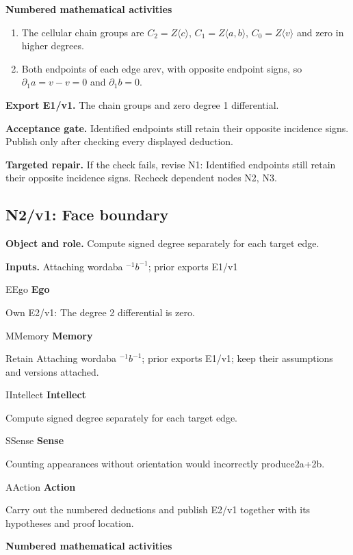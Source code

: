 \documentclass[preprint,12pt,aps,pra,showkeys,amsmath,amssymb,superscriptaddress,floatfix]{revtex4-2}
\theoremstyle{definition}
\theoremstyle{remark}
\newcommand{\mmfaculty}[3]{%
 \begin{mmfacultybox}{#1}{#2}
 {\sffamily\bfseries\color{MMBlue}#2}\par\smallskip #3
 \end{mmfacultybox}}
\newcommand{\field}[2]{\par\smallskip\noindent\textbf{#1.} #2\par}
\begin{document}
\smallskip\noindent\textbf{Numbered mathematical activities}

\begin{enumerate}[label=N1.\arabic*,leftmargin=3.4em]

\item The cellular chain groups are \(C_{2}=Z\langle c\rangle\),
\(C_{1}=Z\langle a,b\rangle\), \(C_{0}=Z\langle v\rangle\) and zero in
higher degrees.

\item Both endpoints of each edge arev, with opposite endpoint signs, so
\(\partial _{1}a=v-v=0\) and \(\partial _{1}b=0\).

\end{enumerate}

\field{Export E1/v1}{The chain groups and zero degree 1 differential.}

\field{Acceptance gate}{Identified endpoints still retain their opposite incidence signs.
Publish only after checking every displayed deduction.}

\field{Targeted repair}{If the check fails, revise N1: Identified endpoints still retain their
opposite incidence signs. Recheck dependent nodes N2, N3.}

\clearpage

\subsection{N2/v1: Face boundary}

\field{Object and role}{Compute signed degree separately for each target edge.}

\field{Inputs}{Attaching wordaba \(^{-1}b^{-1}\); prior exports E1/v1}

\mmfaculty{E}{Ego}{Own E2/v1: The degree 2 differential is zero.}

\mmfaculty{M}{Memory}{Retain Attaching wordaba \(^{-1}b^{-1}\); prior exports E1/v1; keep
their assumptions and versions attached.}

\mmfaculty{I}{Intellect}{Compute signed degree separately for each target edge.}

\mmfaculty{S}{Sense}{Counting appearances without orientation would incorrectly produce2a+2b.}

\mmfaculty{A}{Action}{Carry out the numbered deductions and publish E2/v1 together with its
hypotheses and proof location.}

\smallskip\noindent\textbf{Numbered mathematical activities}
\end{document}
